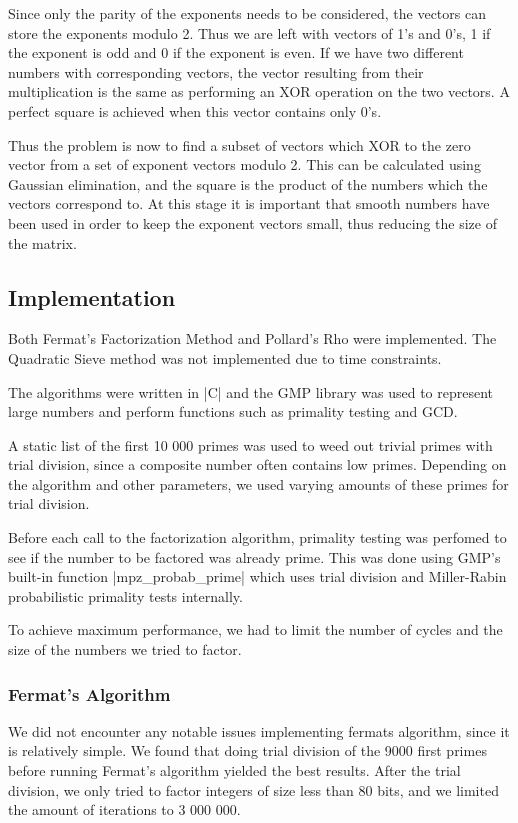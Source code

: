 \documentclass[paper=a4, fontsize=11pt,numbers=endperiod]{scrartcl} %
\numberwithin{equation}{section} %
\numberwithin{figure}{section} %
\numberwithin{table}{section} %
\begin{document}
Since only the parity of the exponents needs to be considered, the vectors can store the exponents modulo 2.
Thus we are left with vectors of 1's and 0's, 1 if the exponent is odd and 0 if the exponent is even.
If we have two different numbers with corresponding vectors, the vector resulting from their multiplication is the same as performing an XOR operation on the two vectors.
A perfect square is achieved when this vector contains only 0's.

Thus the problem is now to find a subset of vectors which XOR to the zero vector from a set of exponent vectors modulo 2.
This can be calculated using Gaussian elimination, and the square is the product of the numbers which the vectors correspond to.
At this stage it is important that smooth numbers have been used in order to keep the exponent vectors small, thus reducing the size of the matrix.


\subsection{Implementation}
Both Fermat's Factorization Method and Pollard's Rho were implemented.
The Quadratic Sieve method was not implemented due to time constraints.

The algorithms were written in |C| and the GMP \cite{gmp} library was used to represent large numbers and perform functions such as primality testing and GCD.

A static list of the first 10 000 primes was used to weed out trivial primes with trial division, since a composite number often contains low primes.
Depending on the algorithm and other parameters, we used varying amounts of these primes for trial division.

Before each call to the factorization algorithm, primality testing was perfomed to see if the number to be factored was already prime.
This was done using GMP's built-in function |mpz_probab_prime| which uses trial division and Miller-Rabin probabilistic primality tests internally. \cite{probabprime}

To achieve maximum performance, we had to limit the number of cycles and the size of the numbers we tried to factor.

\subsubsection{Fermat's Algorithm}
We did not encounter any notable issues implementing fermats algorithm, since it is relatively simple.
We found that doing trial division of the 9000 first primes before running Fermat's algorithm yielded the best results.
After the trial division, we only tried to factor integers of size less than 80 bits, and we limited the amount of iterations to 3 000 000.
\end{document}
